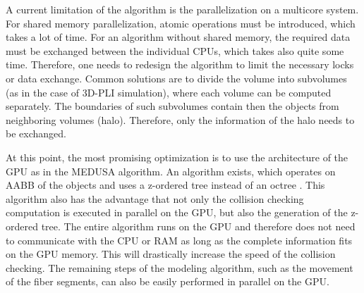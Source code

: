 \par
%
A current limitation of the algorithm is the parallelization on a multicore system.
For shared memory parallelization, atomic operations must be introduced, which takes a lot of time.
For an algorithm without shared memory, the required data must be exchanged between the individual CPUs, which takes also quite some time.
Therefore, one needs to redesign the algorithm to limit the necessary locks or data exchange.
Common solutions are to divide the volume into subvolumes (as in the case of \ac{3D-PLI} simulation), where each volume can be computed separately.
The boundaries of such subvolumes contain then the objects from neighboring volumes (halo).
Therefore, only the information of the halo needs to be exchanged.
\par
%
At this point, the most promising optimization is to use the architecture of the \ac{GPU} as \eg{} in the \ac{MEDUSA} algorithm.
An algorithm exists, which operates on \ac{AABB} of the objects and uses a z-ordered tree instead of an octree \cite{Karras2012}.
This algorithm also has the advantage that not only the collision checking computation is executed in parallel on the \ac{GPU}, but also the generation of the z-ordered tree.
The entire algorithm runs on the \ac{GPU} and therefore does not need to communicate with the \ac{CPU} or \ac{RAM} as long as the complete information fits on the \ac{GPU} memory.
This will drastically increase the speed of the collision checking.
The remaining steps of the modeling algorithm, such as the movement of the fiber segments, can also be easily performed in parallel on the \ac{GPU}.
%
%
%
